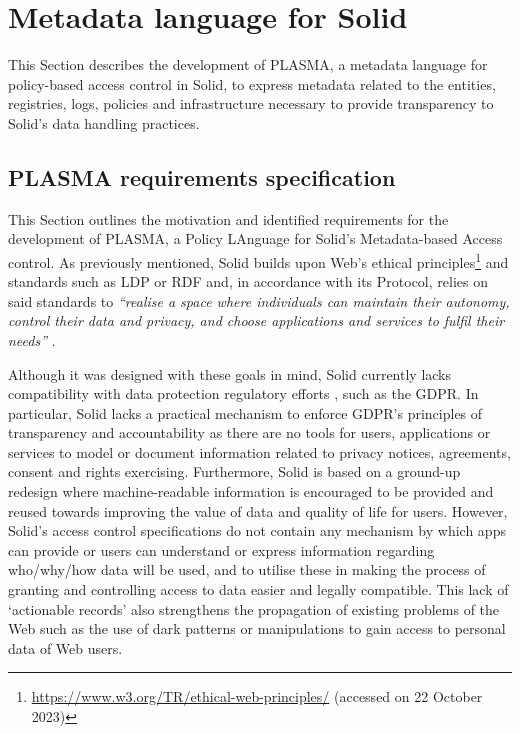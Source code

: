 \section{Metadata language for Solid}
\label{sec:plasma}

This Section describes the development of PLASMA, a metadata language for policy-based access control in Solid, to express metadata related to the entities, registries, logs, policies and infrastructure necessary to provide transparency to Solid's data handling practices.

\subsection{PLASMA requirements specification}
\label{sec:plasma_requirements}

This Section outlines the motivation and identified requirements for the development of PLASMA, a Policy LAnguage for Solid’s Metadata-based Access control.
As previously mentioned, Solid builds upon Web's ethical principles\footnote{\url{https://www.w3.org/TR/ethical-web-principles/} (accessed on 22 October 2023)} and standards such as LDP or RDF and, in accordance with its Protocol, relies on said standards to \textit{``realise a space where individuals can maintain their autonomy, control their data and privacy, and choose applications and services to fulfil their needs''} \citep{capadisli_solid_2022}.

Although it was designed with these goals in mind, Solid currently lacks compatibility with data protection regulatory efforts \citep{pandit_making_2023}, such as the GDPR.
In particular, Solid lacks a practical mechanism to enforce GDPR's principles of transparency and accountability as there are no tools for users, applications or services to model or document information related to privacy notices, agreements, consent and rights exercising.
Furthermore, Solid is based on a ground-up redesign where machine-readable information is encouraged to be provided and reused towards improving the value of data and quality of life for users.
However, Solid's access control specifications do not contain any mechanism by which apps can provide or users can understand or express information regarding who/why/how data will be used, and to utilise these in making the process of granting and controlling access to data easier and legally compatible.
This lack of `actionable records' also strengthens the propagation of existing problems of the Web such as the use of dark patterns or manipulations to gain access to personal data of Web users.

